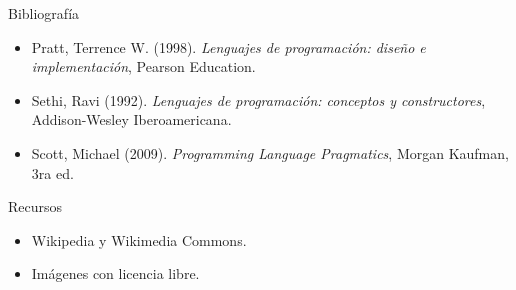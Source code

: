 \documentclass[handout]{beamer} %
\begin{document}
\begin{frame}
 \begin{block}{Bibliografía}
  \begin{itemize}
    \item Pratt, Terrence W. (1998). \textit{Lenguajes de programación: diseño e implementación}, Pearson Education.
    \item Sethi, Ravi (1992). \textit{Lenguajes de programación: conceptos y constructores}, Addison-Wesley Iberoamericana.
    \item Scott, Michael (2009). \textit{Programming Language Pragmatics}, Morgan Kaufman, 3ra ed.
  \end{itemize}
 \end{block}
 \begin{block}{Recursos}
  \begin{itemize}
    \item Wikipedia y Wikimedia Commons.
    \item Imágenes con licencia libre.
  \end{itemize}
 \end{block}
\end{frame}
\end{document}
